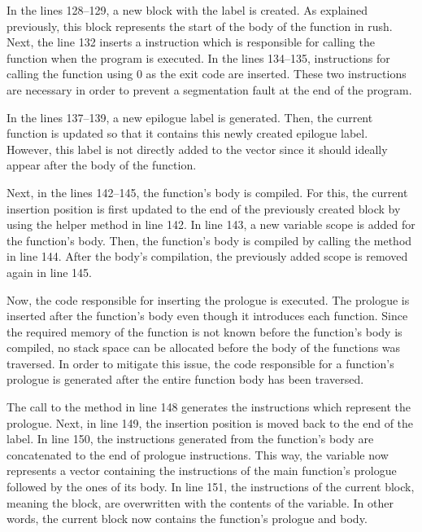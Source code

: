 In the lines 128--129, a new block with the  label is created.
As explained previously, this block represents the start of the body of the  function in rush.
Next, the line 132 inserts a  instruction which is responsible for calling the  function when the program is executed.
In the lines 134--135, instructions for calling the  function using 0 as the exit code are inserted.
These two instructions are necessary in order to prevent a segmentation fault at the end of the program.

In the lines 137--139, a new epilogue label is generated.
Then, the current function is updated so that it contains this newly created epilogue label.
However, this label is not directly added to the   vector since it should ideally appear after the body of the function.

Next, in the lines 142--145, the  function's body is compiled.
For this, the current insertion position is first updated to the end of the previously created  block by using the helper method  in line 142.
In line 143, a new variable scope is added for the function's body.
Then, the function's body is compiled by calling the  method in line 144.
After the body's compilation, the previously added scope is removed again in line 145.

Now, the code responsible for inserting the prologue is executed.
The prologue is inserted after the function's body even though it introduces each function.
Since the required memory of the function is not known before the function's body is compiled,
no stack space can be allocated before the body of the functions was traversed.
In order to mitigate this issue, the code responsible for a function's prologue is generated after the entire function body has been traversed.

The call to the method  in line 148 generates the instructions which represent the prologue.
Next, in line 149, the insertion position is moved back to the end of the  label.
In line 150, the instructions generated from the function's body are concatenated to the end of prologue instructions.
This way, the variable  now represents a vector containing the instructions of the main function's prologue followed by the ones of its body.
In line 151, the instructions of the current block, meaning the  block, are overwritten with the contents of the variable.
In other words, the current block now contains the function's prologue and body.

